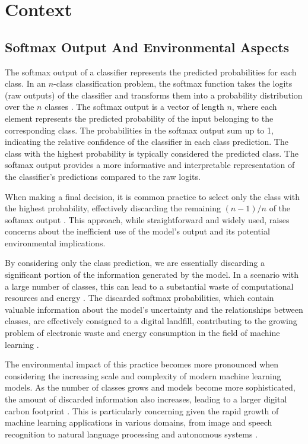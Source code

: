 
\section{Context}

\subsection{Softmax Output And Environmental Aspects}

The softmax output of a classifier represents the predicted probabilities for each class. In an $n$-class classification problem, the softmax function takes the logits (raw outputs) of the classifier and transforms them into a probability distribution over the $n$ classes \cite{goodfellow2016deep}. The softmax output is a vector of length $n$, where each element represents the predicted probability of the input belonging to the corresponding class. The probabilities in the softmax output sum up to 1, indicating the relative confidence of the classifier in each class prediction. The class with the highest probability is typically considered the predicted class. The softmax output provides a more informative and interpretable representation of the classifier's predictions compared to the raw logits.

When making a final decision, it is common practice to select only the class with the highest probability, effectively discarding the remaining $(n-1)/n$ of the softmax output \cite{gal2016uncertainty}. This approach, while straightforward and widely used, raises concerns about the inefficient use of the model's output and its potential environmental implications.

By considering only the class prediction, we are essentially discarding a significant portion of the information generated by the model. In a scenario with a large number of classes, this can lead to a substantial waste of computational resources and energy \cite{strubell2019energy}. The discarded softmax probabilities, which contain valuable information about the model's uncertainty and the relationships between classes, are effectively consigned to a digital landfill, contributing to the growing problem of electronic waste and energy consumption in the field of machine learning \cite{schwartz2020green}.

The environmental impact of this practice becomes more pronounced when considering the increasing scale and complexity of modern machine learning models. As the number of classes grows and models become more sophisticated, the amount of discarded information also increases, leading to a larger digital carbon footprint \cite{lacoste2019quantifying}. This is particularly concerning given the rapid growth of machine learning applications in various domains, from image and speech recognition to natural language processing and autonomous systems \cite{thompson2020computational}.

